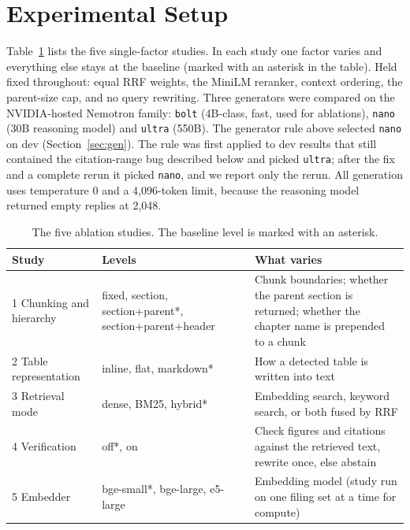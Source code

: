 \documentclass[11pt,a4paper]{article}
\begin{document}
\section{Experimental Setup}\label{sec:setup}
Table~\ref{tab:ablations} lists the five single-factor studies. In each study one factor varies and everything else stays at the baseline (marked with an asterisk in the table). Held fixed throughout: equal RRF weights, the MiniLM reranker, context ordering, the parent-size cap, and no query rewriting. Three generators were compared on the NVIDIA-hosted Nemotron family: \texttt{bolt} (4B-class, fast, used for ablations), \texttt{nano} (30B reasoning model) and \texttt{ultra} (550B). The generator rule above selected \texttt{nano} on dev (Section~\ref{sec:gen}). The rule was first applied to dev results that still contained the citation-range bug described below and picked \texttt{ultra}; after the fix and a complete rerun it picked \texttt{nano}, and we report only the rerun. All generation uses temperature 0 and a 4{,}096-token limit, because the reasoning model returned empty replies at 2{,}048.

\begin{table}[t]
\centering
\caption{The five ablation studies. The baseline level is marked with an asterisk.}
\label{tab:ablations}
\small
\begin{tabular}{@{}p{3.6cm}p{4.2cm}p{6.6cm}@{}}
\toprule
Study & Levels & What varies \\
\midrule
1 Chunking and hierarchy & fixed, section, section+parent*, section+parent+header & Chunk boundaries; whether the parent section is returned; whether the chapter name is prepended to a chunk \\
2 Table representation & inline, flat, markdown* & How a detected table is written into text \\
3 Retrieval mode & dense, BM25, hybrid* & Embedding search, keyword search, or both fused by RRF \\
4 Verification & off*, on & Check figures and citations against the retrieved text, rewrite once, else abstain \\
5 Embedder & bge-small*, bge-large, e5-large & Embedding model (study run on one filing set at a time for compute) \\
\bottomrule
\end{tabular}
\end{table}
\end{document}
